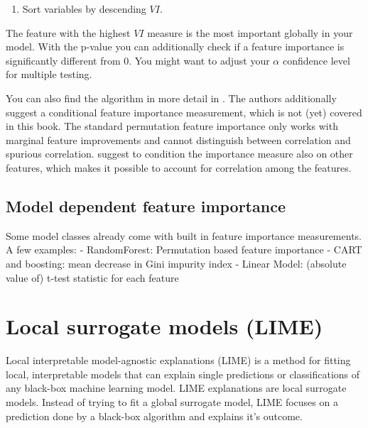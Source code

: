\documentclass[12pt,]{krantz}
\providecommand{\tightlist}{%
  \setlength{\itemsep}{0pt}\setlength{\parskip}{0pt}}
\theoremstyle{definition}
\theoremstyle{definition}
\theoremstyle{definition}
\theoremstyle{remark}
\begin{document}
\begin{enumerate}
\def\labelenumi{\arabic{enumi}.}
\setcounter{enumi}{2}
\tightlist
\item
  Sort variables by descending \(VI\).
\end{enumerate}

The feature with the highest \(VI\) measure is the most important
globally in your model. With the p-value you can additionally check if a
feature importance is significantly different from 0. You might want to
adjust your \(\alpha\) confidence level for multiple testing.

You can also find the algorithm in more detail in \citep{Strobl2008}.
The authors additionally suggest a conditional feature importance
measurement, which is not (yet) covered in this book. The standard
permutation feature importance only works with marginal feature
improvements and cannot distinguish between correlation and spurious
correlation. \citep{Strobl2008} suggest to condition the importance
measure also on other features, which makes it possible to account for
correlation among the features.

\subsection{Model dependent feature
importance}\label{model-dependent-feature-importance}

Some model classes already come with built in feature importance
measurements. A few examples: - RandomForest: Permutation based feature
importance - CART and boosting: mean decrease in Gini impurity index -
Linear Model: (absolute value of) t-test statistic for each feature

\section{Local surrogate models
(LIME)}\label{local-surrogate-models-lime}

Local interpretable model-agnostic explanations (LIME) is a method for
fitting local, interpretable models that can explain single predictions
or classifications of any black-box machine learning model. LIME
explanations are local surrogate models. Instead of trying to fit a
global surrogate model, LIME focuses on a prediction done by a black-box
algorithm and explains it's outcome.
\end{document}
